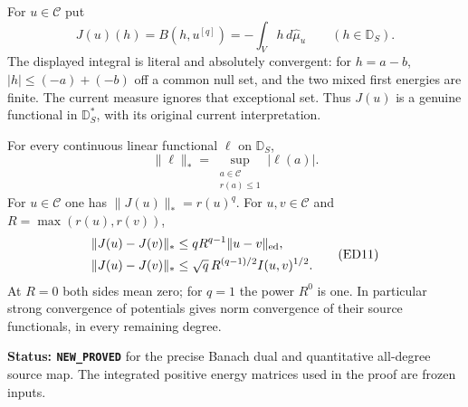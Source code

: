 \begin{definition}
\label{def:r12-dual-curvature}
For $u\in\mathscr C$ put
\[
       J(u)(h)=B(h,u^{[q]})=-\int_Vh\,d\widehat\mu_u
                      \qquad(h\in\mathbb D_S).
 \tag{ED9}
\]
The displayed integral is literal and absolutely convergent: for
$h=a-b$, $|h|\leq(-a)+(-b)$ off a common null set, and the
two mixed first energies are finite. The current measure ignores
that exceptional set. Thus $J(u)$ is a genuine functional in
$\mathbb D_S^*$, with its original current interpretation.
\end{definition}

\begin{theorem}
\label{thm:r12-dual-curvature-continuity}
For every continuous linear functional $\ell$ on $\mathbb D_S$,
\[
 \|\ell\|_*=
     \sup_{\substack{a\in\mathscr C\\r(a)\leq1}}|\ell(a)|.
 \tag{ED10}
\]
For $u\in\mathscr C$ one has $\|J(u)\|_*=r(u)^q$.
For $u,v\in\mathscr C$ and $R=\max(r(u),r(v))$,
\[
 \begin{split}
 \|J(u)-J(v)\|_*&\leq qR^{q-1}\|u-v\|_{\rm ed},\\
 \|J(u)-J(v)\|_*&\leq\sqrt q\,R^{(q-1)/2}I(u,v)^{1/2}.
 \end{split}
 \tag{ED11}
\]
At $R=0$ both sides mean zero; for $q=1$ the power $R^0$ is
one. In particular strong convergence of potentials gives norm
convergence of their source functionals, in every remaining degree.
\end{theorem}

\noindent\textbf{Status: \texttt{NEW\_PROVED}} for the precise
Banach dual and quantitative all-degree source map. The integrated
positive energy matrices used in the proof are frozen inputs.

